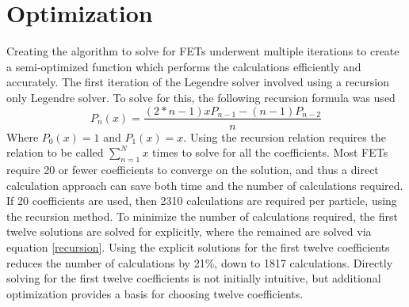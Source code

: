 \documentclass[10tma4paper]{article}
\begin{document}
\section{Optimization}\label{optimization}

Creating the algorithm to solve for FETs underwent multiple iterations to create a semi-optimized function which performs the calculations efficiently and accurately. The first iteration of the Legendre solver involved using a recursion only Legendre solver. To solve for this, the following recursion formula was used
\begin{equation}\label{recursion}
P_{n}(x) = \frac{(2*n-1)xP_{n-1}-(n-1)P_{n-2}}{n}
\end{equation}
Where $P_{0}(x)=1$ and $P_{1}(x)=x$. Using the recursion relation requires the relation to be called $\sum_{n=1}^{N}x$ times to solve for all the coefficients. Most FETs require 20 or fewer coefficients to converge on the solution, and thus a direct calculation approach can save both time and the number of calculations required. If 20 coefficients are used, then 2310 calculations are required per particle, using the recursion method. To minimize the number of calculations required, the first twelve solutions are solved for explicitly, where the remained are solved via equation \eqref{recursion}. Using the explicit solutions for the first twelve coefficients reduces the number of calculations by 21\%, down to 1817 calculations. Directly solving for the first twelve coefficients is not initially intuitive, but additional optimization provides a basis for choosing twelve coefficients.
\\
\end{document}
